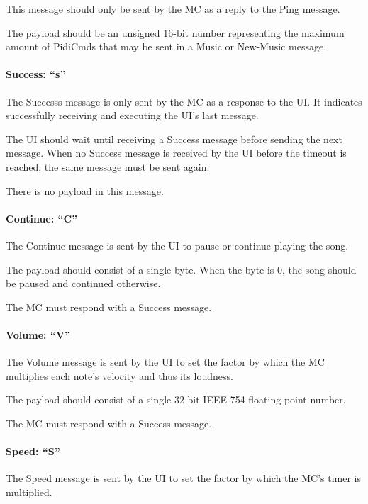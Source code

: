 This message should only be sent by the MC as a reply to the Ping message.

The payload should be an unsigned 16-bit number representing the maximum amount of PidiCmds that may be sent in a Music or New-Music message.

\paragraph{Success: \enquote{s}}

The Successs message is only sent by the MC as a response to the UI. It indicates successfully receiving and executing the UI's last message.

The UI should wait until receiving a Success message before sending the next message. When no Success message is received by the UI before the timeout is reached, the same message must be sent again.

There is no payload in this message.

\paragraph{Continue: \enquote{C}}

The Continue message is sent by the UI to pause or continue playing the song.

The payload should consist of a single byte. When the byte is 0, the song should be paused and continued otherwise.

The MC must respond with a Success message.

\paragraph{Volume: \enquote{V}}

The Volume message is sent by the UI to set the factor by which the MC multiplies each note's velocity and thus its loudness.

The payload should consist of a single 32-bit IEEE-754 floating point number.

The MC must respond with a Success message.

\paragraph{Speed: \enquote{S}}

The Speed message is sent by the UI to set the factor by which the MC's timer is multiplied.


